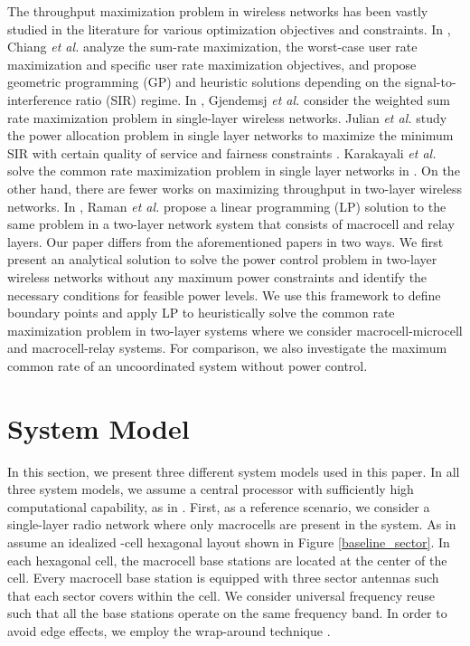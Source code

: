 \documentclass[conference,letterpaper,final,10pt]{IEEEtran}
\begin{document}
The throughput maximization problem in wireless networks has been vastly studied in the literature for various optimization objectives and constraints. In \cite{Geometric}, Chiang \emph{et al.} analyze the sum-rate maximization, the worst-case user rate maximization and specific user rate maximization objectives, and propose geometric programming (GP) and heuristic solutions depending on the signal-to-interference ratio (SIR) regime. In \cite{BinaryPC}, Gjendemsj \emph{et al.} consider the weighted sum rate maximization problem in single-layer wireless networks. Julian \emph{et al.} study the power allocation problem in single layer networks to maximize the minimum SIR with certain quality of service and fairness constraints \cite{BoydAdHoc}. Karakayali \emph{et al.} solve the common rate maximization problem in single layer networks in \cite{Karakayali}. On the other hand, there are fewer works on maximizing throughput in two-layer wireless networks. In \cite{RamanConf}, Raman \emph{et al.} propose a linear programming (LP) solution to the same problem in a two-layer network system that consists of macrocell and relay layers. Our paper differs from the aforementioned papers in two ways. We first present an analytical solution to solve the power control problem in two-layer wireless networks without any maximum power constraints and identify the necessary conditions for feasible power levels. We use this framework to define boundary points and apply LP to heuristically solve the common rate maximization problem in two-layer systems where we consider macrocell-microcell and macrocell-relay systems. For comparison, we also investigate the maximum common rate of an uncoordinated system without power control.

\section{System Model}\label{SystemModel}
In this section, we present three different system models used in this paper. In all three system models, we assume a central processor with sufficiently high computational capability, as in \cite{RamanConf,Karakayali,Goodman}. First, as a reference scenario, we consider a single-layer radio network where only macrocells are present in the system. As in \cite{RamanConf,Karakayali} assume an idealized -cell hexagonal layout shown in Figure \ref{baseline_sector}. In each hexagonal cell, the macrocell base stations are located at the center of the cell. Every macrocell base station is equipped with three sector antennas such that each sector covers  within the cell. We consider universal frequency reuse such that all the base stations operate on the same frequency band. In order to avoid edge effects, we employ the wrap-around technique \cite{RamanConf}.
\end{document}
